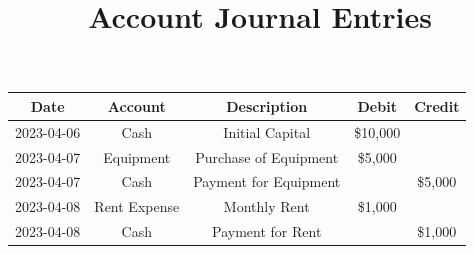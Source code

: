 \documentclass{article}
\begin{document}
\title{Account Journal Entries}
\author{}
\date{}
\maketitle

\begin{tabular}{|c|c|c|c|c|}
\hline
\textbf{Date} & \textbf{Account} & \textbf{Description} & \textbf{Debit} & \textbf{Credit} \\
\hline
2023-04-06 & Cash & Initial Capital & \$10,000 &  \\
\hline
2023-04-07 & Equipment & Purchase of Equipment & \$5,000 &  \\
\hline
2023-04-07 & Cash & Payment for Equipment &  & \$5,000 \\
\hline
2023-04-08 & Rent Expense & Monthly Rent & \$1,000 &  \\
\hline
2023-04-08 & Cash & Payment for Rent &  & \$1,000 \\
\hline
\end{tabular}
\end{document}

